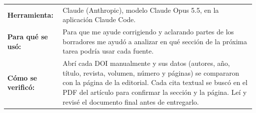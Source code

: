 \documentclass[11pt,a4paper]{article}
\begin{document}
\noindent
\begin{tabularx}{\textwidth}{>{\bfseries}l >{\raggedright\arraybackslash}X}
 Herramienta: & Claude (Anthropic), modelo Claude Opus 5.5, en la aplicación Claude Code. \\
  Para qué se usó: & Para que me ayude corrigiendo y aclarando partes de los borradores me ayudó a analizar en qué sección de la próxima tarea podría usar cada fuente. \\[6pt]
  Cómo se verificó: & Abrí cada DOI manualmente y sus datos (autores, año, título, revista, volumen, número y páginas) se compararon con la página de la editorial. Cada cita textual se buscó en el PDF del artículo para confirmar la sección y la página. Leí y revisé el documento final antes de entregarlo.
\end{tabularx}

\printbibliography[title={Referencias}]
\end{document}
